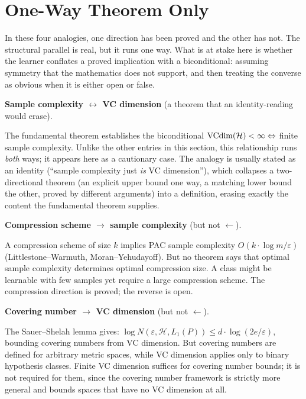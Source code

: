 \section{One-Way Theorem Only}
\label{sec:one-way}

In these four analogies, one direction has been proved and the other has
not. The structural parallel is real, but it runs one way. What is at stake
here is whether the learner conflates a proved implication with a
biconditional: assuming symmetry that the mathematics does not support, and
then treating the converse as obvious when it is either open or false.

\begin{obstbox}
\textbf{Sample complexity $\leftrightarrow$ VC dimension}
(a theorem that an identity-reading would erase).

\medskip\noindent
The fundamental theorem establishes the biconditional
$\mathrm{VCdim}(\mathcal{H}) < \infty \Leftrightarrow$ finite sample
complexity. Unlike the
other entries in this section, this relationship runs \emph{both} ways; it
appears here as a cautionary case.  The analogy is usually stated as an
identity (``sample complexity just \emph{is} VC dimension''), which
collapses a two-directional theorem (an explicit upper bound one way, a
matching lower bound the other, proved by different arguments) into a
definition, erasing exactly the content the fundamental theorem supplies.
\end{obstbox}

\begin{obstbox}
\textbf{Compression scheme $\rightarrow$ sample complexity} (but not
$\leftarrow$).

\medskip\noindent
A compression scheme of size $k$ implies PAC sample complexity
$O(k \cdot \log m / \varepsilon)$ (Littlestone--Warmuth, Moran--Yehudayoff).
But no theorem says that optimal sample complexity determines optimal
compression size. A class might be learnable with few samples yet require
a large compression scheme. The compression direction is proved;
the reverse is open.
\end{obstbox}

\begin{obstbox}
\textbf{Covering number $\rightarrow$ VC dimension} (but not
$\leftarrow$).

\medskip\noindent
The Sauer--Shelah lemma gives: $\log N(\varepsilon, \mathcal{H},
L_1(P)) \leq d \cdot \log(2e/\varepsilon)$, bounding covering numbers
from VC dimension. But covering numbers are defined for arbitrary
metric spaces, while VC dimension applies only to binary hypothesis
classes. Finite VC dimension suffices for covering number
bounds; it is not required for them, since the covering number framework is
strictly more general and bounds spaces that have no VC dimension at all.
\end{obstbox}

